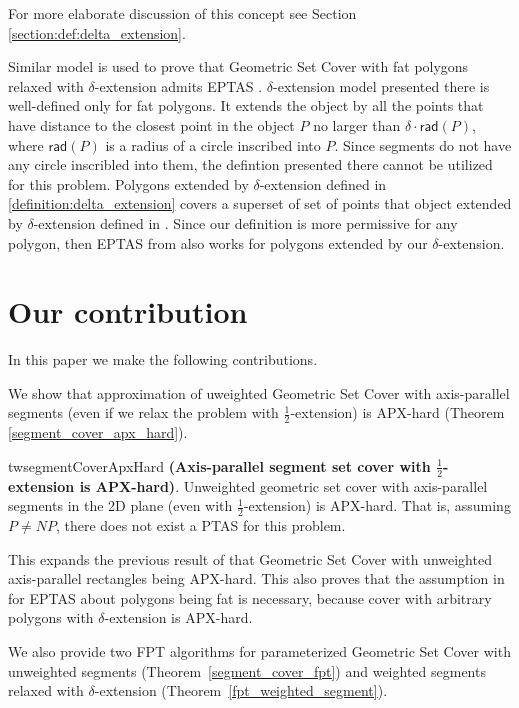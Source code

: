 For more elaborate discussion of this concept see Section
\ref{section:def:delta_extension}.

Similar model is used to prove that Geometric Set Cover with fat polygons
relaxed with $\delta$-extension admits EPTAS \cite{harpeled12}.
$\delta$-extension model presented there is well-defined only
for fat polygons. It extends the object by all the points that
have distance to the closest point in the object $P$
no larger than $\delta\cdot \mathsf{rad}(P)$, where $\mathsf{rad}(P)$
is a radius of a circle inscribed into $P$.
Since segments do not have any circle inscribled into them,
the defintion presented there cannot be utilized for this problem.
Polygons extended by $\delta$-extension
defined in \ref{definition:delta_extension}
covers a superset of set of points that object extended
by $\delta$-extension defined in \cite{harpeled12}.
Since our definition is more permissive for any polygon,
then EPTAS from \cite{harpeled12}
also works for polygons extended by our $\delta$-extension.

\section*{Our contribution}
In this paper we make the following contributions.

We show that approximation of uweighted Geometric Set Cover with axis-parallel segments
(even if we relax the problem with  $\frac{1}{2}$-extension) is APX-hard
(Theorem \ref{segment_cover_apx_hard}).

\begin{restatable}{tw}{segmentCoverApxHard}{
\label{segment_cover_apx_hard}
	\textbf{(Axis-parallel segment set cover with $\frac{1}{2}$-extension is APX-hard)}.	
	Unweighted geometric set cover
	with axis-parallel segments in the 2D plane
	(even with $\frac{1}{2}$-extension) is APX-hard.
	That is, assuming $P\neq NP$, there does not exist a PTAS
	for this problem.
}\end{restatable}

This expands the previous result of \cite{rectangles_apx_hard} 
that Geometric Set Cover
with unweighted axis-parallel rectangles being APX-hard.
This also proves that the assumption in \cite{harpeled12}
for EPTAS about polygons being fat is necessary, because
cover with arbitrary polygons with $\delta$-extension is APX-hard.

We also provide two FPT algorithms for parameterized Geometric Set Cover 	
with unweighted segments (Theorem~\ref{segment_cover_fpt})
and weighted segments relaxed with $\delta$-extension
(Theorem~\ref{fpt_weighted_segment}).

